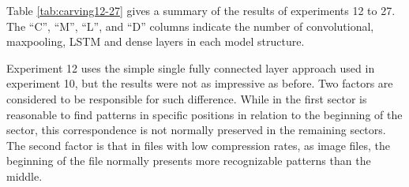 Table \ref{tab:carving12-27} gives a summary of the results of experiments 12 to 27. The ``C'', ``M'', ``L'', and ``D'' columns indicate the number of convolutional, maxpooling, LSTM and dense layers in each model structure.


Experiment 12 uses the simple single fully connected layer approach used in experiment 10, but the results were not as impressive as before. Two factors are considered to be responsible for such difference. While in the first sector is reasonable to find patterns in specific positions in relation to the beginning of the sector, this correspondence is not normally preserved in the remaining sectors. The second factor is that in files with low compression rates, as image files, the beginning of the file normally presents more recognizable patterns than the middle.

